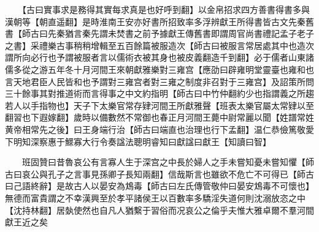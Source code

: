 　　【古曰實事求是務得其實每求真是也好呼到翻】以金帛招求四方善書得書多與漢朝等【朝直遥翻】是時淮南王安亦好書所招致率多浮辨獻王所得書皆古文先秦舊書【師古曰先秦猶言秦先謂未焚書之前予據獻王傳舊書即謂周官尚書禮記孟子老子之書】采禮樂古事稍稍增輯至五百餘篇被服造次【師古曰被服言常居處其中也造次謂所向必行也予謂被服者言以儒術衣被其身也被皮義翻造千到翻】必于儒者山東諸儒多從之游五年冬十月河間王來朝獻雅樂對三雍宫【應劭曰辟雍明堂靈臺也雍和也言天地君臣人民皆和也予謂對三雍宫者對三雍之制度非召對于三雍宫】及詔策所問三十餘事其對推道術而言得事之中文約指明【師古曰中竹仲翻約少也指謂義之所趨若人以手指物也】天子下太樂官常存肄河間王所獻雅聲【班表太樂官屬太常肄以至翻習也下遐嫁翻】歲時以備數然不常御也春正月河間王薨中尉常麗以聞【姓譜常姓黄帝相常先之後】曰王身端行治【師古曰端直也治理也行下孟翻】温仁恭儉篤敬愛下明知深察惠于鰥寡大行令奏諡法聰明睿知曰獻諡曰獻王【知讀曰智】

　　班固贊曰昔魯哀公有言寡人生于深宫之中長於婦人之手未嘗知憂未嘗知懼【師古曰哀公與孔子之言事見孫卿子長知兩翻】信哉斯言也雖欲不危亡不可得已【師古曰己語終辭】是故古人以晏安為鴆毒【師古曰左氏傳管敬仲曰晏安鴆毒不可懷也】無德而富貴謂之不幸漢興至於孝平諸侯王以百數率多驕淫失道何則沈溺放恣之中【沈持林翻】居埶使然也自凡人猶繫于習俗而况哀公之倫乎夫惟大雅卓爾不羣河間獻王近之矣

